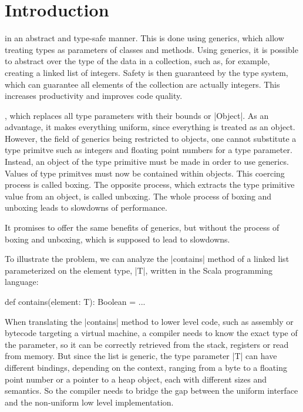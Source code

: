 \section{Introduction}

 in an abstract and type-safe manner. This is done using generics, which allow treating types as parameters of classes and methods. Using generics, it is possible to abstract over the type of the data in a collection, such as, for example, creating a linked list of integers. Safety is then guaranteed by the type system, which can guarantee all elements of the collection are actually integers. This increases productivity and improves code quality.

, which replaces all type parameters with their bounds or |Object|. As an advantage, it makes everything uniform, since everything is treated as an object. However, the field of generics being restricted to objects, one cannot substitute a type primitve such as integers and floating point numbers for a type parameter. Instead, an object of the type primitive must be made in order to use generics. Values of type primitves must now be contained within objects. This coercing process is called boxing. The opposite process, which extracts the type primitive value from an object, is called unboxing. The whole process of boxing and unboxing leads to slowdowns of performance.

 It promises to offer the same benefits of generics, but without the process of boxing and unboxing, which is supposed to lead to slowdowns.


 To illustrate the problem, we can analyze the |contains| method of a linked list parameterized on the element type, |T|, written in the Scala programming language:

\begin{lstlisting-nobreak}
 def contains(element: T): Boolean = ...
\end{lstlisting-nobreak}

When translating the |contains| method to lower level code, such as assembly or bytecode targeting a virtual machine, a compiler needs to know the exact type of the parameter, so it can be correctly retrieved from the stack, registers or read from memory. But since the list is generic, the type parameter |T| can have different bindings, depending on the context, ranging from a byte to a floating point number or a pointer to a heap object, each with different sizes and semantics. So the compiler needs to bridge the gap between the uniform interface and the non-uniform low level implementation.

